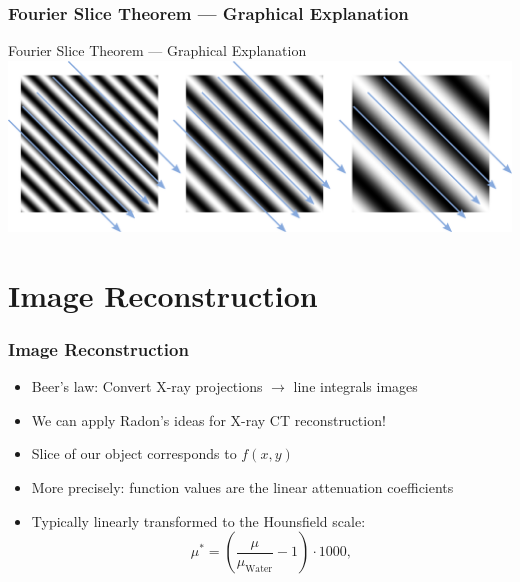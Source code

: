 \begin{frame}
	\frametitle{Fourier Slice Theorem --- Graphical Explanation}
	\centering
	\def\svgwidth{0.55\linewidth}
	

\end{frame}

\begin{frame}[c]{Fourier Slice Theorem --- Graphical Explanation}
	\centering
	\includegraphics[height=0.6\textheight]{images/ProjetionAndFourierTransform}
\end{frame}

\subtitle{Computed Tomography --- Part 2}
\frame[plain,c]{\titlepage}

\section{Image Reconstruction}

\begin{frame}
	\frametitle{Image Reconstruction}

	\begin{itemize}
		\setlength\itemsep{0.3cm}
		\item Beer's law: Convert X-ray projections $\rightarrow$ line integrals images
		\item We can apply Radon's ideas for X-ray CT reconstruction!
		\item Slice of our object corresponds to $f(x,y)$
		\item More precisely: function values are the linear attenuation coefficients
		\item Typically linearly transformed to the Hounsfield scale:
		      \begin{equation}
			      \mu^* = \left( \frac{\mu}{\mu_\text{Water}} - 1 \right) \cdot 1000,
		      \end{equation}
	\end{itemize}

\end{frame}


